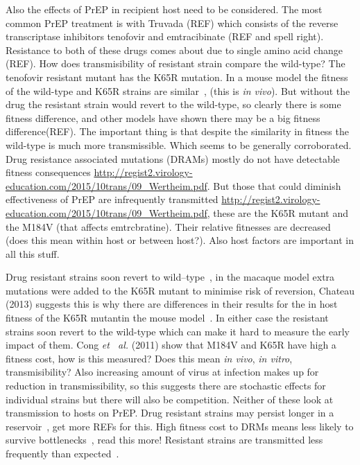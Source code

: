 \documentclass[DIV=15]{scrartcl}
\begin{document}
\iffalse
Also the effects of PrEP in recipient host need to be considered. The most common PrEP treatment is with Truvada (REF) which consists of the reverse transcriptase inhibitors tenofovir and emtracibinate (REF and spell right). Resistance to both of these drugs comes about due to single amino acid change (REF). How does transmisibility of resistant strain compare the wild-type? The tenofovir resistant mutant has the K65R mutation. In a mouse model the fitness of the wild-type and K65R strains are similar~\cite{chateau2013}, (this is   \textit{in vivo}). But without the drug the resistant strain would revert to the wild-type, so clearly there is some fitness difference, and other models have shown there may be a big fitness difference(REF). The important thing is that despite the similarity in fitness the wild-type is much more transmissible. Which seems to  be generally corroborated. Drug resistance associated mutations (DRAMs) mostly do not have detectable fitness consequences 
 \url{http://regist2.virology-education.com/2015/10trans/09_Wertheim.pdf}. But those that could diminish effectiveness of PrEP are infrequently transmitted \url{http://regist2.virology-education.com/2015/10trans/09_Wertheim.pdf}, these are the K65R mutant and the M184V (that affects emtrcbratine). Their relative fitnesses are decreased (does this mean within host or between host?). Also  host factors are important in all this stuff.


Drug resistant strains soon revert to wild--type~\cite{cong2011},  in the macaque model extra mutations were added to the K65R mutant  to minimise risk  of reversion, Chateau (2013) suggests this is why there  are differences in their results for the in host fitness of the K65R mutantin the mouse model~\cite{chateau2013}. In either case the resistant strains soon revert to the wild-type which can make it hard to measure the early  impact of them. Cong \textit{et \ al.} (2011) show that  M184V and K65R have high a fitness cost, how is this measured? Does this mean \textit{in vivo}, \textit{in vitro}, transmisibility? Also increasing amount of virus at infection makes up for reduction in transmissibility, so this suggests there are stochastic effects for individual strains but there will also be competition. Neither of these look at transmission to hosts on PrEP. Drug resistant strains may persist longer in a reservoir~\cite{chateau2013}, get more REFs for this.
High fitness cost to DRMs means less likely to survive bottlenecks~\cite{wagner2012}, read this more! Resistant strains are transmitted  less frequently than expected~\cite{leighbrown2003}.
\end{document}
